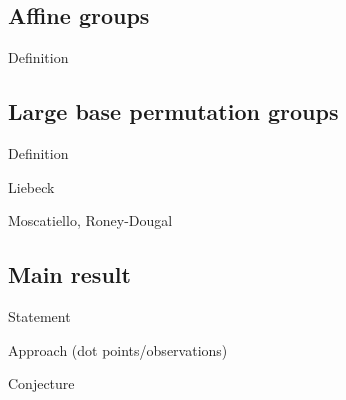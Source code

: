 \subsection{Affine groups}

\begin{slide}
    Definition
\end{slide}

\subsection{Large base permutation groups}

\begin{slide}
    Definition
\end{slide}

\begin{slide}
    Liebeck

    Moscatiello, Roney-Dougal
\end{slide}

\subsection{Main result}

\begin{slide}
    Statement
\end{slide}

\begin{slide}
    Approach (dot points/observations)
\end{slide}

\begin{slide}
    Conjecture
\end{slide}